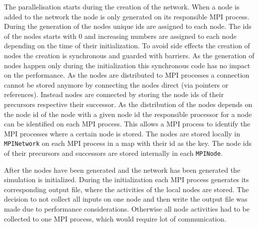 \documentclass[12pt]{article}
\begin{document}
The parallelisation starts during the creation of the network. When a node is added to the network the node is only generated on its responsible MPI process.
During the generation of the nodes unique ids are assigned to each node.
The ids of the nodes starts with 0 and increasing numbers are assigned to each node depending on the time of their initialization.
To avoid side effects the creation of nodes the creation is synchronous and guarded with barriers. As the generation of nodes happen only during the initialization this synchronous code has no impact on the performance.
As the nodes are distributed to MPI processes a connection cannot be stored anymore by connecting the nodes direct (via pointers or references). Instead nodes are connected by storing the node ids of their precursors respective their successor.
As the distribution of the nodes depends on the node id of the node with a given node id the responsible processor for a node can be identified on each MPI process. This allows a MPI process to identify the MPI processes where a certain node is stored.
The nodes are stored locally in \texttt{MPINetwork} on each MPI process in a map with their id as the key. The node ids of their precursors and successors are stored internally in each \texttt{MPINode}.

After the nodes have been generated and the network has been generated the simulation is initialized. During the initialization each MPI process generates its corresponding output file, where the activities of the local nodes are stored. The decision to not collect all inputs on one node and then write the output file was made due to performance considerations. Otherwise all node activities had to be collected to one MPI process, which would require lot of communication.
\end{document}
